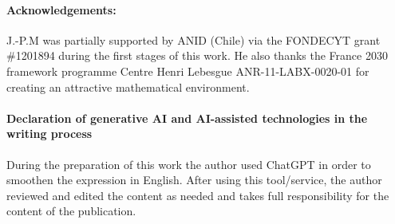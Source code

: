 \documentclass{amsart}
\newcounter{ex}
\newcounter{re}
\begin{document}
\vskip 12pt

\paragraph{\bf Acknowledgements:} J.-P.M was partially
supported by ANID (Chile) via the FONDECYT grant \#1201894 during the first stages of this work.
He also thanks the France 2030 framework programme Centre Henri Lebesgue ANR-11-LABX-0020-01 
for creating an attractive mathematical environment.

\vskip 12pt

\paragraph{\bf Declaration of generative AI and AI-assisted technologies in the writing process}

During the preparation of this work the author used ChatGPT in order to smoothen the expression in English. After using this tool/service, the author reviewed and edited the content as needed and takes full responsibility for the content of the publication.

\vskip 12pt
\end{document}

